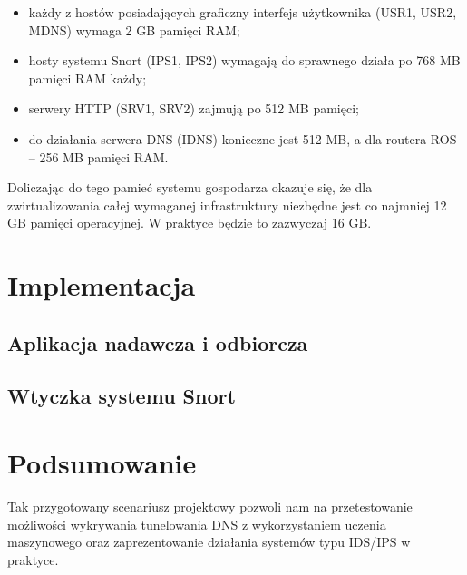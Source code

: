 \documentclass{eiti-raport}
\begin{document}
\begin{itemize}
	\item każdy z hostów posiadających graficzny interfejs użytkownika (USR1, USR2, MDNS) wymaga 2 GB pamięci RAM;
	\item hosty systemu Snort (IPS1, IPS2) wymagają do sprawnego działa po 768 MB pamięci RAM każdy;
	\item serwery HTTP (SRV1, SRV2) zajmują po 512 MB pamięci;
	\item do działania serwera DNS (IDNS) konieczne jest 512 MB, a dla routera ROS -- 256 MB pamięci RAM.
\end{itemize}
Doliczając do tego pamieć systemu gospodarza okazuje się, że dla zwirtualizowania całej wymaganej infrastruktury niezbędne jest co najmniej 12 GB pamięci operacyjnej. W praktyce będzie to zazwyczaj 16 GB. 

\section{Implementacja} \label{sec:plugin}

\subsection{Aplikacja nadawcza i odbiorcza}


\subsection{Wtyczka systemu Snort}


\section{Podsumowanie} \label{sec:summary}
Tak przygotowany scenariusz projektowy pozwoli nam na przetestowanie możliwości wykrywania tunelowania DNS z wykorzystaniem uczenia maszynowego oraz zaprezentowanie działania systemów typu IDS/IPS w praktyce. 
\end{document}
